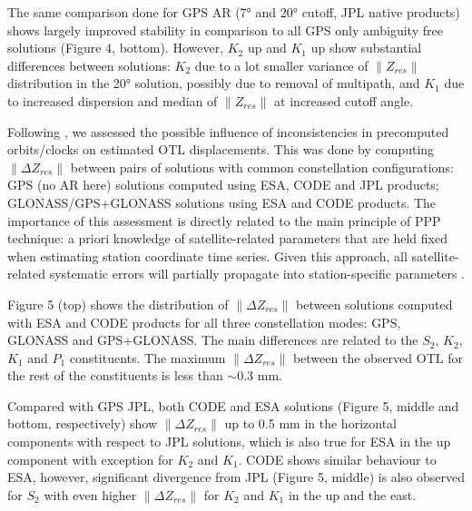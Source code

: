 \documentclass[se, manuscript]{copernicus}
\begin{document}
The same comparison done for GPS AR (7° and 20° cutoff, JPL native products) shows largely improved stability in comparison to all GPS only ambiguity free solutions (Figure 4, bottom). However, $K_2$ up and $K_1$ up show substantial differences between solutions: $K_2$ due to a lot smaller variance of $\|Z_{res}\|$ distribution in the 20° solution, possibly due to removal of multipath, and $K_1$ due to increased dispersion and median of $\|Z_{res}\|$ at increased cutoff angle.

Following \cite{Yuan2013}, we assessed the possible influence of inconsistencies in precomputed orbits/clocks on estimated OTL displacements. This was done by computing $\|\Delta Z_{res}\|$ between pairs of solutions with common constellation configurations: GPS (no AR here) solutions computed using ESA, CODE and JPL products; GLONASS/GPS+GLONASS solutions using ESA and CODE products. The importance of this assessment is directly related to the main principle of PPP technique: a priori knowledge of satellite-related parameters that are held fixed when estimating station coordinate time series. Given this approach, all satellite-related systematic errors will partially propagate into station-specific parameters \citep{Yuan2013}.

Figure 5 (top) shows the distribution of $\|\Delta Z_{res}\|$ between solutions computed with ESA and CODE products for all three constellation modes: GPS, GLONASS and GPS+GLONASS. The main differences are related to the $S_2$, $K_2$, $K_1$ and $P_1$ constituents. The maximum $\|\Delta Z_{res}\|$ between the observed OTL for the rest of the constituents is less than $\sim$0.3 mm.

Compared with GPS JPL, both CODE and ESA solutions (Figure 5, middle and bottom, respectively) show $\|\Delta Z_{res}\|$ up to 0.5 mm in the horizontal components with respect to JPL solutions, which is also true for ESA in the up component with exception for $K_2$ and $K_1$. CODE shows similar behaviour to ESA, however, significant divergence from JPL (Figure 5, middle) is also observed for $S_2$ with even higher $\|\Delta Z_{res}\|$ for $K_2$ and $K_1$ in the up and the east.
\end{document}
